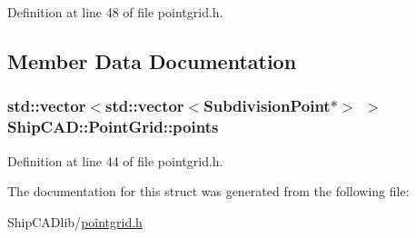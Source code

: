 Definition at line 48 of file pointgrid.\-h.



\subsection{Member Data Documentation}
\hypertarget{structShipCAD_1_1PointGrid_acb874cfa2bdda20e8a996e0e1a153feb}{
\subsubsection[{points}]{\setlength{\rightskip}{0pt plus 5cm}std\-::vector$<$std\-::vector$<${\bf Subdivision\-Point}$\ast$$>$ $>$ Ship\-C\-A\-D\-::\-Point\-Grid\-::points}}\label{structShipCAD_1_1PointGrid_acb874cfa2bdda20e8a996e0e1a153feb}


Definition at line 44 of file pointgrid.\-h.



The documentation for this struct was generated from the following file\-:\begin{DoxyCompactItemize}
\item 
Ship\-C\-A\-Dlib/\hyperlink{pointgrid_8h}{pointgrid.\-h}\end{DoxyCompactItemize}
